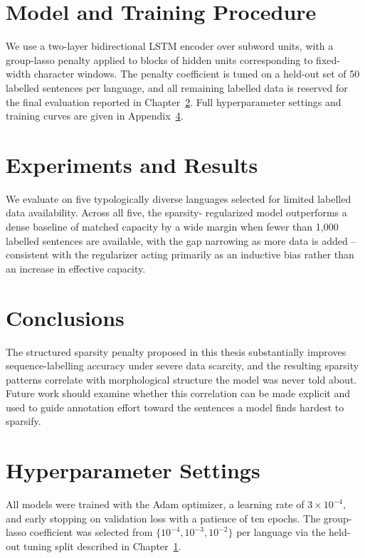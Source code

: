 \documentclass[fullpage]{uiucthesis}
\begin{document}
\chapter{Model and Training Procedure}
\label{ch:model}

We use a two-layer bidirectional LSTM encoder over subword units,
with a group-lasso penalty applied to blocks of hidden units
corresponding to fixed-width character windows. The penalty
coefficient is tuned on a held-out set of 50 labelled sentences per
language, and all remaining labelled data is reserved for the final
evaluation reported in Chapter~\ref{ch:results}. Full hyperparameter
settings and training curves are given in
Appendix~\ref{app:hyperparams}.

\chapter{Experiments and Results}
\label{ch:results}

We evaluate on five typologically diverse languages selected for
limited labelled data availability. Across all five, the sparsity-
regularized model outperforms a dense baseline of matched capacity
by a wide margin when fewer than 1{,}000 labelled sentences are
available, with the gap narrowing as more data is added -- consistent
with the regularizer acting primarily as an inductive bias rather
than an increase in effective capacity.

\chapter{Conclusions}

The structured sparsity penalty proposed in this thesis
substantially improves sequence-labelling accuracy under severe data
scarcity, and the resulting sparsity patterns correlate with
morphological structure the model was never told about. Future work
should examine whether this correlation can be made explicit and
used to guide annotation effort toward the sentences a model finds
hardest to sparsify.

\appendix

\chapter{Hyperparameter Settings}
\label{app:hyperparams}

All models were trained with the Adam optimizer, a learning rate of
$3\times 10^{-4}$, and early stopping on validation loss with a
patience of ten epochs. The group-lasso coefficient was selected
from $\{10^{-4}, 10^{-3}, 10^{-2}\}$ per language via the held-out
tuning split described in Chapter~\ref{ch:model}.
\end{document}
